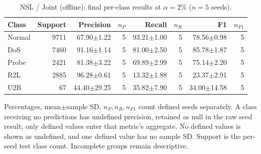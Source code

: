 \begin{table}[t]
\centering\scriptsize
\setlength{\tabcolsep}{3.3pt}
\caption{NSL / Joint (offline): final per-class results at $\alpha=2\%$ ($n=5$ seeds).}\label{tab:forgetting-class-nsl_kdd-joint}
\begin{tabular}{lrrrrrrr}
\toprule
Class & Support & Precision & $n_P$ & Recall & $n_R$ & F1 & $n_{F1}$ \\
\midrule
Normal & 9711 & 67.90$\pm$1.22 & 5 & 93.21$\pm$1.00 & 5 & 78.56$\pm$0.98 & 5 \\
DoS & 7460 & 91.16$\pm$1.14 & 5 & 81.00$\pm$2.50 & 5 & 85.78$\pm$1.87 & 5 \\
Probe & 2421 & 81.38$\pm$3.22 & 5 & 69.89$\pm$2.99 & 5 & 75.14$\pm$2.20 & 5 \\
R2L & 2885 & 96.28$\pm$0.61 & 5 & 13.32$\pm$1.88 & 5 & 23.37$\pm$2.91 & 5 \\
U2R & 67 & 44.40$\pm$29.25 & 5 & 35.82$\pm$7.90 & 5 & 34.00$\pm$14.58 & 5 \\
\bottomrule
\end{tabular}
\par\smallskip\begin{minipage}{0.98\textwidth}\scriptsize Percentages, mean$\pm$sample SD. $n_P,n_R,n_{F1}$ count defined seeds separately. A class receiving no predictions has undefined precision, retained as null in the raw seed result; only defined values enter that metric's aggregate. No defined values is shown as undefined, and one defined value has no sample SD. Support is the per-seed test class count. Incomplete groups remain descriptive.\end{minipage}
\end{table}

